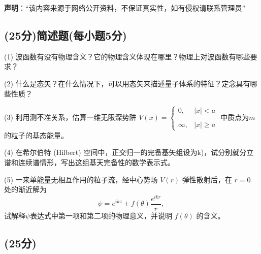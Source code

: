 
\textbf{声明}：“该内容来源于网络公开资料，不保证真实性，如有侵权请联系管理员”

\subsection{(25分)简述题(每小题5分)}

(1) 波函数有没有物理含义？它的物理含义体现在哪里？物理上对波函数有哪些要求？

(2) 什么是态矢？在什么情况下，可以用态矢来描述量子体系的特征？定念具有哪些性质？

(3) 利用测不准关系，估算一维无限深势阱 $V(x) = \begin{cases} 
0, & |x| < a \\\\
\infty, & |x| \geq a
\end{cases}$ 中质点为$m$的粒子的基态能量。

(4) 在希尔伯特 (Hilbert) 空间中，正交归一的完备基矢组设为{k)}，试分别就分立谱和连续谱情形，写出这组基天完备性的数学表示式。

(5) 一来单能量无相互作用的粒子流，经中心势场 $V(r)$ 弹性散射后，在 $r=0$ 处的渐近解为
$$ \psi = e^{ikz} + f(\theta) \frac{e^{ikr}}{r},~$$
试解释$\psi$表达式中第一项和第二项的物理意义，并说明 $f(\theta)$ 的含义。
\subsection{(25分)}